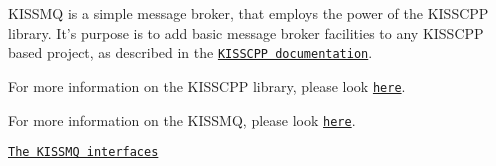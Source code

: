 K\-I\-S\-S\-M\-Q is a simple message broker, that employs the power of the K\-I\-S\-S\-C\-P\-P library. It's purpose is to add basic message broker facilities to any K\-I\-S\-S\-C\-P\-P based project, as described in the \href{http://thelastcylon.github.io/kisscpp/md_the_basic_problem.html}{\tt K\-I\-S\-S\-C\-P\-P documentation}.

For more information on the K\-I\-S\-S\-C\-P\-P library, please look \href{http://thelastcylon.github.io/kisscpp/index.html}{\tt here}.\par
 For more information on the K\-I\-S\-S\-M\-Q, please look \href{http://thelastcylon.github.io/kissmq/index.html}{\tt here}.


\begin{DoxyItemize}
\item \href{md_the_kissmq_interfaces.html}{\tt The K\-I\-S\-S\-M\-Q interfaces} 
\end{DoxyItemize}